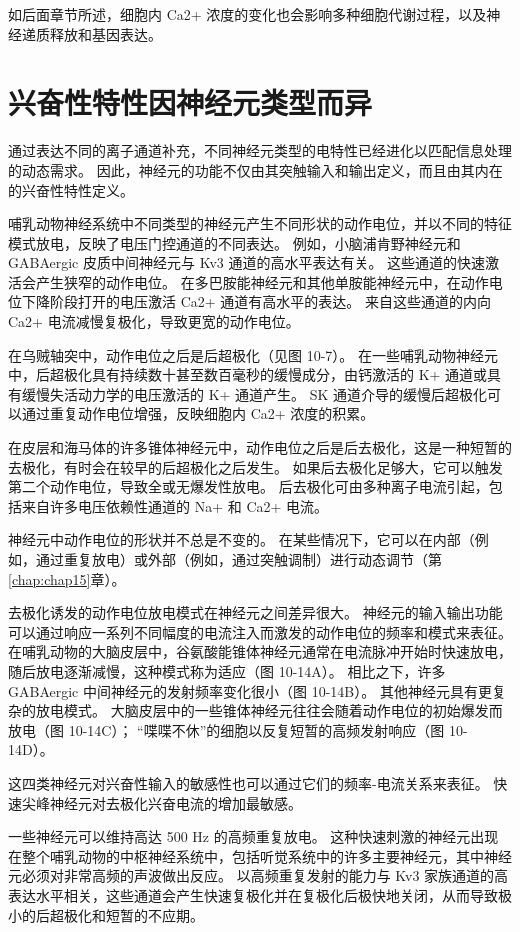 如后面章节所述，细胞内 Ca2+ 浓度的变化也会影响多种细胞代谢过程，以及神经递质释放和基因表达。



\section{兴奋性特性因神经元类型而异}

通过表达不同的离子通道补充，不同神经元类型的电特性已经进化以匹配信息处理的动态需求。 
因此，神经元的功能不仅由其突触输入和输出定义，而且由其内在的兴奋性特性定义。


哺乳动物神经系统中不同类型的神经元产生不同形状的动作电位，并以不同的特征模式放电，反映了电压门控通道的不同表达。 
例如，小脑浦肯野神经元和 GABAergic 皮质中间神经元与 Kv3 通道的高水平表达有关。 
这些通道的快速激活会产生狭窄的动作电位。 在多巴胺能神经元和其他单胺能神经元中，在动作电位下降阶段打开的电压激活 Ca2+ 通道有高水平的表达。 
来自这些通道的内向 Ca2+ 电流减慢复极化，导致更宽的动作电位。


在乌贼轴突中，动作电位之后是后超极化（见图 10-7）。 
在一些哺乳动物神经元中，后超极化具有持续数十甚至数百毫秒的缓慢成分，由钙激活的 K+ 通道或具有缓慢失活动力学的电压激活的 K+ 通道产生。 
SK 通道介导的缓慢后超极化可以通过重复动作电位增强，反映细胞内 Ca2+ 浓度的积累。


在皮层和海马体的许多锥体神经元中，动作电位之后是后去极化，这是一种短暂的去极化，有时会在较早的后超极化之后发生。 
如果后去极化足够大，它可以触发第二个动作电位，导致全或无爆发性放电。 
后去极化可由多种离子电流引起，包括来自许多电压依赖性通道的 Na+ 和 Ca2+ 电流。


神经元中动作电位的形状并不总是不变的。 
在某些情况下，它可以在内部（例如，通过重复放电）或外部（例如，通过突触调制）进行动态调节（第 \ref{chap:chap15}章）。


去极化诱发的动作电位放电模式在神经元之间差异很大。 神经元的输入输出功能可以通过响应一系列不同幅度的电流注入而激发的动作电位的频率和模式来表征。 
在哺乳动物的大脑皮层中，谷氨酸能锥体神经元通常在电流脉冲开始时快速放电，随后放电逐渐减慢，这种模式称为适应（图 10-14A）。 
相比之下，许多 GABAergic 中间神经元的发射频率变化很小（图 10-14B）。 
其他神经元具有更复杂的放电模式。 大脑皮层中的一些锥体神经元往往会随着动作电位的初始爆发而放电（图 10-14C）； “喋喋不休”的细胞以反复短暂的高频发射响应（图 10-14D）。


这四类神经元对兴奋性输入的敏感性也可以通过它们的频率-电流关系来表征。 
快速尖峰神经元对去极化兴奋电流的增加最敏感。


一些神经元可以维持高达 500 Hz 的高频重复放电。 
这种快速刺激的神经元出现在整个哺乳动物的中枢神经系统中，包括听觉系统中的许多主要神经元，其中神经元必须对非常高频的声波做出反应。 
以高频重复发射的能力与 Kv3 家族通道的高表达水平相关，这些通道会产生快速复极化并在复极化后极快地关闭，从而导致极小的后超极化和短暂的不应期。


